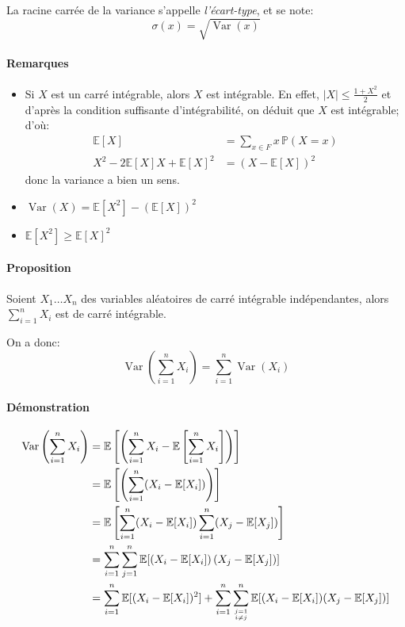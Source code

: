 \documentclass[a4paper,10pt,french,openany]{memoir}
\newcommand{\Proba}{\mathbb{P}}
\newcommand{\Esper}{\mathbb{E}}
\newcommand{\abs}[1]{\lvert #1 \rvert}
\DeclareMathOperator{\Var}{Var}
\begin{document}
La racine carrée de la variance s'appelle \emph{l'écart-type}, et se note: \[\sigma(x)=\sqrt{\Var(x)}\]

\paragraph{Remarques}
\begin{itemize}
 \item Si $X$ est un carré intégrable, alors $X$ est intégrable. En effet, $\abs{X}\leq\frac{1+X^2}2$ et d'après la condition suffisante d'intégrabilité, on déduit que $X$ est intégrable; d'où:
 \begin{align*}
 \Esper[X] &= \sum_{x\in F} x\,\Proba(X=x) \\
 X^2-2 \Esper[X] X+\Esper[X]^2 &= (X-\Esper[X])^2
 \end{align*}
 donc la variance a bien un sens.
 \item $\Var(X)=\Esper[X^2]-(\Esper[X])^2$
 \item $\Esper[X^2]\geq\Esper[X]^2$
\end{itemize}

\paragraph{Proposition}
Soient $X_1\dots X_n$ des variables aléatoires de carré intégrable indépendantes, alors $\sum_{i=1}^n X_i$ est de carré intégrable.

On a donc:
\[\Var \left(\sum_{i=1}^n X_i\right) = \sum_{i=1}^n \Var(X_i)\]

\paragraph{Démonstration}
\begin{align*}
 \Var \left(\sum_{i=1}^n X_i\right) &= \Esper\left[\left(\sum_{i=1}^n X_i - \Esper\left[\sum_{i=1}^n X_i\right]\right)\right] \\
    &= \Esper\left[\left(\sum_{i=1}^n (X_i - \Esper[X_i])\right)\right] \\
    &= \Esper\left[\sum_{i=1}^n (X_i - \Esper[X_i]) \sum_{i=1}^n (X_j - \Esper[X_j])\right] \\
    &= \sum_{i=1}^n \sum_{j=1}^n \Esper[(X_i - \Esper[X_i])\,(X_j - \Esper[X_j])] \\
    &= \sum_{i=1}^n \Esper[(X_i - \Esper[X_i])^2] + \sum_{i=1}^n \sum_{\genfrac{}{}{0pt}{}{j=1}{i\neq j}}^n \Esper[(X_i - \Esper[X_i])(X_j - \Esper[X_j])]
\end{align*}
\end{document}
